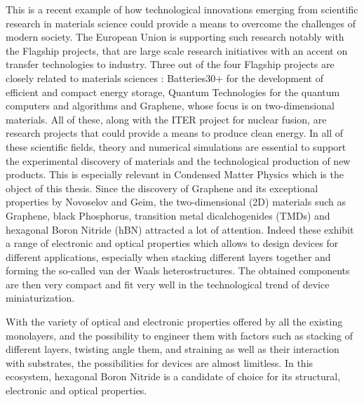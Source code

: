 This is a recent example of how technological innovations emerging from scientific research in materials science could provide a means to overcome the challenges of modern society. The European Union is supporting such research notably with the Flagship projects, that are large scale research initiatives with an accent on transfer technologies to industry. Three out of the four Flagship projects are closely related to materials sciences : Batteries30+ for the development of efficient and compact energy storage, Quantum Technologies for the quantum computers and algorithms and Graphene, whose focus is on two-dimensional materials. All of these, along with the ITER project for nuclear fusion, are research projects that could provide a means to produce clean energy. In all of these scientific fields, theory and numerical simulations are essential to support the experimental discovery of materials and the technological production of new products. This is especially relevant in Condensed Matter Physics which is the object of this thesis. Since the discovery of Graphene and its exceptional properties by Novoselov and Geim,\cite{graphene} the two-dimensional (2D) materials such as Graphene, black Phosphorus, transition metal dicalchogenides (TMDs) and hexagonal Boron Nitride (hBN) attracted a lot of attention. Indeed these exhibit a range of electronic and optical properties which allows to design devices for different applications, especially when stacking different layers together and forming the so-called van der Waals heterostructures.\cite{something} The obtained components are then very compact and fit very well in the technological trend of device miniaturization.

With the variety of optical and electronic properties offered by all the existing monolayers, and the possibility to engineer them with factors such as stacking of different layers,\cite{sponza2018direct} twisting angle them,\cite{latil2023structural, impellizzeri2022electronic} and straining\cite{blundo2021strain} as well as their interaction with substrates, the possibilities for devices are almost limitless. In this ecosystem, hexagonal Boron Nitride is a candidate of choice for its structural, electronic and optical properties.

% 
